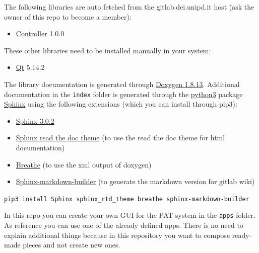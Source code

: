
The following libraries are auto fetched from the gitlab.dei.unipd.it
host (ask the owner of this repo to become a member):

\begin{itemize}
  \tightlist
  \item
        \href{https://gitlab.dei.unipd.it/PAT/Controller.git}{Controller}
        1.0.0
\end{itemize}

These other libraries need to be installed manually in your system:

\begin{itemize}
  \tightlist
  \item
        \href{https://www.qt.io/}{Qt} 5.14.2
\end{itemize}

The library documentation is generated through
\href{http://www.doxygen.nl/download.html}{Doxygen 1.8.13}. Additional
documentation in the \texttt{index} folder is generated through the
\href{https://www.anaconda.com/products/individual}{python3} package
\href{https://www.sphinx-doc.org/en/master/}{Sphinx} using the following
extensions (which you can install through pip3):

\begin{itemize}
  \tightlist
  \item
        \href{https://pypi.org/project/Sphinx/}{Sphinx 3.0.2}
  \item
        \href{https://sphinx-rtd-theme.readthedocs.io/en/stable/}{Sphinx read
          the doc theme} (to use the read the doc theme for html documentation)
  \item
        \href{https://pypi.org/project/breathe/}{Breathe} (to use the xml
        output of doxygen)
  \item
        \href{https://pypi.org/project/sphinx-markdown-builder/}{Sphinx-markdown-builder}
        (to generate the markdown version for gitlab wiki)
\end{itemize}

\texttt{pip3\ install\ Sphinx\ sphinx\_rtd\_theme\ breathe\ sphinx-markdown-builder}


In this repo you can create your own GUI for the PAT system in the
\texttt{apps} folder. As reference you can use one of the already
defined apps. There is no need to explain additional things because in
this repository you want to compose ready-made pieces and not create new
ones.


